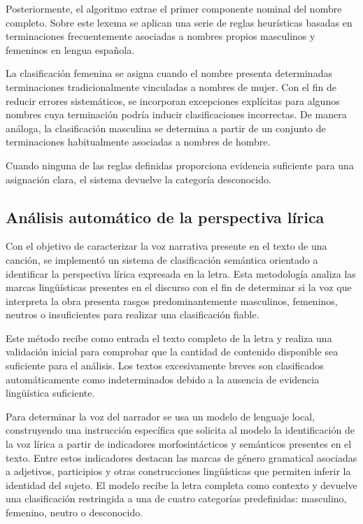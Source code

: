 Posteriormente, el algoritmo extrae el primer componente nominal del nombre completo. Sobre este lexema se aplican una serie de reglas heurísticas basadas en terminaciones frecuentemente asociadas a nombres propios masculinos y femeninos en lengua española.

La clasificación femenina se asigna cuando el nombre presenta determinadas terminaciones tradicionalmente vinculadas a nombres de mujer. Con el fin de reducir errores sistemáticos, se incorporan excepciones explícitas para algunos nombres cuya terminación podría inducir clasificaciones incorrectas. De manera análoga, la clasificación masculina se determina a partir de un conjunto de terminaciones habitualmente asociadas a nombres de hombre.

Cuando ninguna de las reglas definidas proporciona evidencia suficiente para una asignación clara, el sistema devuelve la categoría desconocido.

\subsection{Análisis automático de la perspectiva lírica}
Con el objetivo de caracterizar la voz narrativa presente en el texto de una canción, se implementó un sistema de clasificación semántica orientado a identificar la perspectiva lírica expresada en la letra. Esta metodología analiza las marcas lingüísticas presentes en el discurso con el fin de determinar si la voz que interpreta la obra presenta rasgos predominantemente masculinos, femeninos, neutros o insuficientes para realizar una clasificación fiable.

Este método recibe como entrada el texto completo de la letra y realiza una validación inicial para comprobar que la cantidad de contenido disponible sea suficiente para el análisis. Los textos excesivamente breves son clasificados automáticamente como indeterminados debido a la ausencia de evidencia lingüística suficiente.

Para determinar la voz del narrador se usa un modelo de lenguaje local, construyendo una instrucción específica que solicita al modelo la identificación de la voz lírica a partir de indicadores morfosintácticos y semánticos presentes en el texto. Entre estos indicadores destacan las marcas de género gramatical asociadas a adjetivos, participios y otras construcciones lingüísticas que permiten inferir la identidad del sujeto. El modelo recibe la letra completa como contexto y devuelve una clasificación restringida a una de cuatro categorías predefinidas: masculino, femenino, neutro o desconocido.

